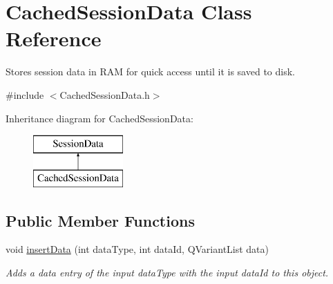 \hypertarget{class_cached_session_data}{\section{Cached\-Session\-Data Class Reference}
\label{class_cached_session_data}
}


Stores session data in R\-A\-M for quick access until it is saved to disk.  




{\ttfamily \#include $<$Cached\-Session\-Data.\-h$>$}

Inheritance diagram for Cached\-Session\-Data\-:\begin{figure}[H]
\begin{center}
\leavevmode
\includegraphics[height=2.000000cm]{class_cached_session_data}
\end{center}
\end{figure}
\subsection*{Public Member Functions}
\begin{DoxyCompactItemize}
\item 
void \hyperlink{class_cached_session_data_af55cc646029afe6a6ac0893a3bc8d5fc}{insert\-Data} (int data\-Type, int data\-Id, Q\-Variant\-List data)
\begin{DoxyCompactList}\small\item\em Adds a data entry of the input data\-Type with the input data\-Id to this object. \end{DoxyCompactList}\end{DoxyCompactItemize}

